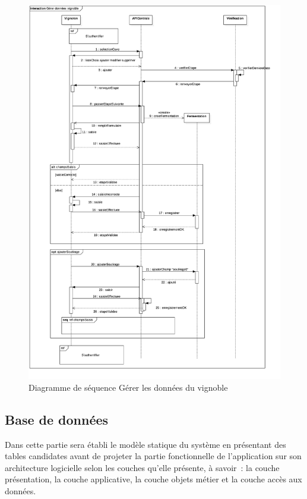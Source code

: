 \documentclass[a4paper, title]{report}
\begin{document}
\begin{figure}
\centering
\includegraphics{Images/SequenceDiagramGererDonneesVignoble}
\caption{Diagramme de séquence Gérer les données du vignoble}
\end{figure}

\subsection{Base de données}\label{base-de-donnes}

Dans cette partie sera établi le modèle statique du système en
présentant des tables candidates avant de projeter la partie
fonctionnelle de l'application sur son architecture logicielle selon les
couches qu'elle présente, à savoir~: la couche présentation, la couche
applicative, la couche objets métier et la couche accès aux données.
\end{document}
